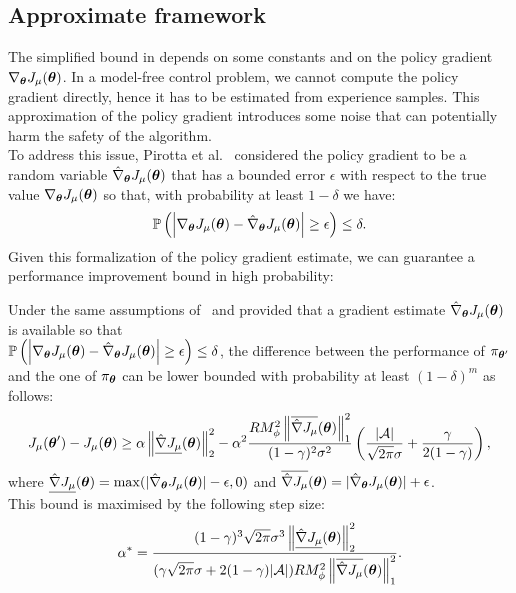 \newcommand{\estgradj}{\hat{\nabla}_{\vtheta}J_\mu(\vtheta)}
\newcommand{\upgradj}{\overline{\hat{\nabla}J_\mu}(\vtheta)}
\newcommand{\botgradj}{\underline{\hat{\nabla}J_\mu}(\vtheta)}
\subsection{Approximate framework}
The simplified bound in  depends on some constants and on the policy gradient $\nabla_{{\boldsymbol{\theta}}}J_\mu({\boldsymbol{\theta}})$. In a model-free control problem, we cannot compute the policy gradient directly, hence it has to be estimated from experience samples. This approximation of the policy gradient introduces some noise that can potentially harm the safety of the algorithm.\\
To address this issue, Pirotta et al.~\cite{adaptive_step} considered the policy gradient to be a random variable $\estgradj$ that has a bounded error $\epsilon$ with respect to the true value $\nabla_{{\boldsymbol{\theta}}}J_\mu({\boldsymbol{\theta}})$ so that, with probability at least $1-\delta$ we have:
\[
\mathbb{P}\left(\left|\gradj - \estgradj\right|\geq\epsilon\right)\leq\delta.
\]
Given this formalization of the policy gradient estimate, we can guarantee a performance improvement bound in high probability:
\begin{theorem}
Under the same assumptions of~ and provided that a gradient estimate $\estgradj$ is available so that \\$\mathbb{P}\left(\left|\gradj - \estgradj\right|\geq\epsilon\right)\leq\delta$, the difference between the performance of $\pi_{{\boldsymbol{\theta}}'}$ and the one of $\pi_{{\boldsymbol{\theta}}}$ can be lower bounded with probability at least $(1-\delta)^m$ as follows:
\[
J_\mu(\vtheta') - J_\mu(\vtheta) \geq \alpha\norm[2]{\botgradj}^2 - \alpha^2\frac{RM_\phi^2\norm[1]{\upgradj}^2}{(1-\gamma)^2\sigma^2}\left( \frac{|\aspace|}{\sqrt{2\pi}\sigma} + \frac{\gamma}{2(1-\gamma)} \right),
\]
where $\botgradj=\max(|\estgradj|-\epsilon, 0)$ and $\upgradj=|\estgradj|+\epsilon$.\\
This bound is maximised by the following step size:
\[
\alpha^* = \frac{(1-\gamma)^3\sqrt{2\pi}\sigma^3\norm[2]{\botgradj}^2}{(\gamma\sqrt{2\pi}\sigma +2(1-\gamma)|\aspace|)RM_\phi^2\norm[1]{\upgradj}^2}.
\]
\end{theorem}

